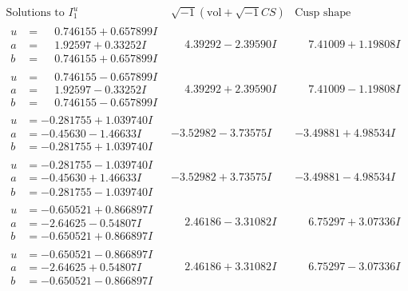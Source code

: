 \documentclass[1p]{elsarticle_modified}
\theoremstyle{definition}
\newcommand{\I}{\sqrt{-1}}
\begin{document}
$$\begin{array}{c|c|c}  
\text{Solutions to }I^u_{1}& \I (\text{vol} + \sqrt{-1}CS) & \text{Cusp shape}\\
 \hline 
\begin{aligned}
u &= \phantom{-}0.746155 + 0.657899 I \\
a &= \phantom{-}1.92597 + 0.33252 I \\
b &= \phantom{-}0.746155 + 0.657899 I\end{aligned}
 & \phantom{-}4.39292 - 2.39590 I & \phantom{-}7.41009 + 1.19808 I \\ \hline\begin{aligned}
u &= \phantom{-}0.746155 - 0.657899 I \\
a &= \phantom{-}1.92597 - 0.33252 I \\
b &= \phantom{-}0.746155 - 0.657899 I\end{aligned}
 & \phantom{-}4.39292 + 2.39590 I & \phantom{-}7.41009 - 1.19808 I \\ \hline\begin{aligned}
u &= -0.281755 + 1.039740 I \\
a &= -0.45630 - 1.46633 I \\
b &= -0.281755 + 1.039740 I\end{aligned}
 & -3.52982 - 3.73575 I & -3.49881 + 4.98534 I \\ \hline\begin{aligned}
u &= -0.281755 - 1.039740 I \\
a &= -0.45630 + 1.46633 I \\
b &= -0.281755 - 1.039740 I\end{aligned}
 & -3.52982 + 3.73575 I & -3.49881 - 4.98534 I \\ \hline\begin{aligned}
u &= -0.650521 + 0.866897 I \\
a &= -2.64625 - 0.54807 I \\
b &= -0.650521 + 0.866897 I\end{aligned}
 & \phantom{-}2.46186 - 3.31082 I & \phantom{-}6.75297 + 3.07336 I \\ \hline\begin{aligned}
u &= -0.650521 - 0.866897 I \\
a &= -2.64625 + 0.54807 I \\
b &= -0.650521 - 0.866897 I\end{aligned}
 & \phantom{-}2.46186 + 3.31082 I & \phantom{-}6.75297 - 3.07336 I \\ \hline\begin{aligned}

\end{aligned}
\end{array}$$
\end{document}
